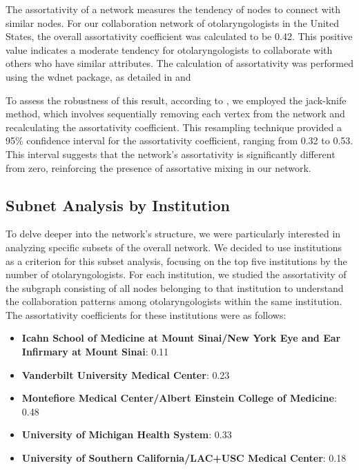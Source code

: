 \documentclass[12pt]{article}
\begin{document}
The assortativity of a network measures the tendency of nodes to connect with similar nodes. For our collaboration network of otolaryngologists in the United States, the overall assortativity coefficient was calculated to be 0.42. This positive value indicates a moderate tendency for otolaryngologists to collaborate with others who have similar attributes. The calculation of assortativity was performed using the wdnet package, as detailed in \citep{yuan2021assortativity} and \citep{yuan2023generating}


To assess the robustness of this result, according to \citep{pigorsch2022assortative}, we employed the jack-knife method, which involves sequentially removing each vertex from the network and recalculating the assortativity coefficient. This resampling technique provided a 95\% confidence interval for the assortativity coefficient, ranging from 0.32 to 0.53. This interval suggests that the network's assortativity is significantly different from zero, reinforcing the presence of assortative mixing in our network. 
\subsection{Subnet Analysis by Institution}

To delve deeper into the network’s structure, we were particularly interested in analyzing specific subsets of the overall network. We decided to use institutions as a criterion for this subset analysis, focusing on the top five institutions by the number of otolaryngologists. For each institution, we studied the assortativity of the subgraph consisting of all nodes belonging to that institution to understand the collaboration patterns among otolaryngologists within the same institution. The assortativity coefficients for these institutions were as follows:

\begin{itemize}
    \item \textbf{Icahn School of Medicine at Mount Sinai/New York Eye and Ear Infirmary at Mount Sinai}: 0.11
    \item \textbf{Vanderbilt University Medical Center}: 0.23
    \item \textbf{Montefiore Medical Center/Albert Einstein College of Medicine}: 0.48
    \item \textbf{University of Michigan Health System}: 0.33
    \item \textbf{University of Southern California/LAC+USC Medical Center}: 0.18
\end{itemize}
\end{document}
